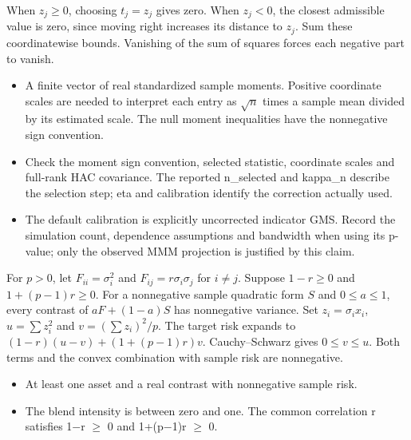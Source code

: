\expandafter\def\csname statadic@proof@STATADIC-INEQUALITY-001\endcsname{When $z_j\ge0$, choosing $t_j=z_j$ gives zero.
  When $z_j<0$, the closest admissible value is zero, since moving right
  increases its distance to $z_j$. Sum these coordinatewise bounds.
  Vanishing of the sum of squares forces each negative part to vanish.}
\expandafter\def\csname statadic@assumptions@STATADIC-INEQUALITY-001\endcsname{\begin{itemize}
\item A finite vector of real standardized sample moments. Positive coordinate scales are needed to interpret each entry as \ensuremath{\sqrt{n}} times a sample mean divided by its estimated scale. The null moment inequalities have the nonnegative sign convention.
\end{itemize}}
\expandafter\def\csname statadic@diagnostics@STATADIC-INEQUALITY-001\endcsname{\begin{itemize}
\item Check the moment sign convention, selected statistic, coordinate scales and full-rank HAC covariance. The reported n\_selected and kappa\_n describe the selection step; eta and calibration identify the correction actually used.
\item The default calibration is explicitly uncorrected indicator GMS. Record the simulation count, dependence assumptions and bandwidth when using its p-value; only the observed MMM projection is justified by this claim.
\end{itemize}}
\expandafter\def\csname statadic@statement@STATADIC-SHRINKAGE-001\endcsname{For $p>0$, let $F_{ii}=\sigma_i^2$ and
  $F_{ij}=r\sigma_i\sigma_j$ for $i\ne j$. Suppose
  $1-r\ge0$ and $1+(p-1)r\ge0$. For a nonnegative sample quadratic
  form $S$ and $0\le a\le1$, every contrast of $aF+(1-a)S$
  has nonnegative variance.}
\expandafter\def\csname statadic@proof@STATADIC-SHRINKAGE-001\endcsname{Set $z_i=\sigma_i x_i$, $u=\sum z_i^2$ and
  $v=(\sum z_i)^2/p$. The target risk expands to
  $(1-r)(u-v)+(1+(p-1)r)v$. Cauchy--Schwarz gives $0\le v\le u$.
  Both terms and the convex combination with sample risk are nonnegative.}
\expandafter\def\csname statadic@assumptions@STATADIC-SHRINKAGE-001\endcsname{\begin{itemize}
\item At least one asset and a real contrast with nonnegative sample risk.
\item The blend intensity is between zero and one. The common correlation r satisfies 1\ensuremath{-}r \ensuremath{\ge} 0 and 1+(p\ensuremath{-}1)r \ensuremath{\ge} 0.
\end{itemize}}
